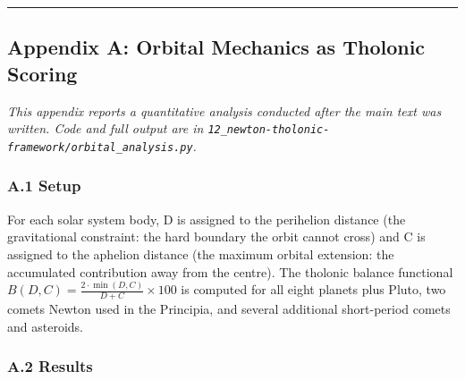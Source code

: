 \documentclass[12pt]{article}
\begin{document}
\begin{center}\rule{0.5\linewidth}{0.5pt}\end{center}

\subsection{Appendix A: Orbital Mechanics as Tholonic
Scoring}\label{appendix-a-orbital-mechanics-as-tholonic-scoring}

\emph{This appendix reports a quantitative analysis conducted after the
main text was written. Code and full output are in
\texttt{12\_newton-tholonic-framework/orbital\_analysis.py}.}

\subsubsection{A.1 Setup}\label{a.1-setup}

For each solar system body, D is assigned to the perihelion distance
(the gravitational constraint: the hard boundary the orbit cannot cross)
and C is assigned to the aphelion distance (the maximum orbital
extension: the accumulated contribution away from the centre). The
tholonic balance functional
\(B(D,C) = \frac{2 \cdot \min(D,C)}{D+C} \times 100\) is computed for
all eight planets plus Pluto, two comets Newton used in the Principia,
and several additional short-period comets and asteroids.

\subsubsection{A.2 Results}\label{a.2-results}
\end{document}
